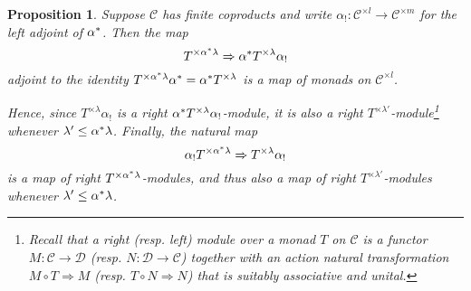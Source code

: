 \documentclass[a4paper,10pt
,draft
]{article}%
\numberwithin{equation}{section}
\numberwithin{figure}{section}
\newtheorem{proposition}[equation]{Proposition}%
\theoremstyle{definition} %
\newcommand{\C}{\ensuremath{\mathcal C}}
\newcommand{\1}{\ensuremath{\mathbbm 1}}%
\begin{document}
\begin{proposition}\label{MONADICFUN PROP}
	Suppose $\C$ has finite coproducts and write
	$\alpha_{!} \colon \mathcal{C}^{\times l} \to 
	\mathcal{C}^{\times m}$
	for the left adjoint of $\alpha^{\**}$. 
	Then the map
\begin{equation}\label{MONADFUNCTORALPHA EQ}
	T^{\times \alpha^{\**} \lambda} \Rightarrow \alpha^{\**} T^{\times \lambda} \alpha_{!}
\end{equation}
adjoint to the identity 
$T^{\times \alpha^{\**}\lambda} \alpha^{\**} =
\alpha^{\**} T^{\times \lambda}$
is a map of monads on $\C^{\times l}$.

Hence, since $T^{\times \lambda} \alpha_!$ is a right 
$\alpha^{\**} T^{\times \lambda}\alpha_{!}$-module, 
it is also a right $T^{\times \lambda'}$-module\footnote{
Recall that a right (resp. left) module
over a monad $T$ on $\mathcal{C}$
is a functor $M \colon \mathcal{C} \to \mathcal{D}$
(resp. $N \colon \mathcal{D} \to \mathcal{C}$)
together with an action natural transformation
$M \circ T \Rightarrow M$
(resp. $T \circ N \Rightarrow N$)
that is suitably associative and unital.}
whenever
$\lambda' \leq \alpha^{\**} \lambda$.
Finally, the natural map 
\begin{equation}\label{MONADFUNCTORALPHADOU EQ}
	\alpha_{!} T^{\times \alpha^{\**} \lambda} \Rightarrow  T^{\times \lambda} \alpha_{!}
\end{equation}
is a map of right $T^{\times \alpha^{\**} \lambda}$-modules, 
and thus also a map of right 
$T^{\times \lambda'}$-modules
whenever $\lambda' \leq \alpha^{\**} \lambda$.
\end{proposition}

\end{document}
